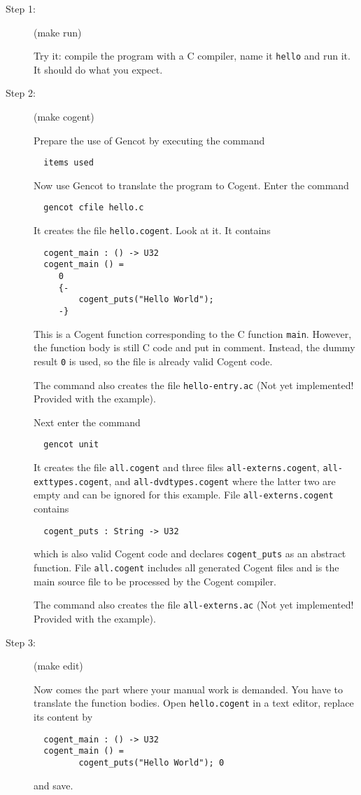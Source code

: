\documentclass[a4paper]{report}
\newcommand{\code}[1]{\textnormal{\texttt{#1}}}
\begin{document}
\begin{description}
\item[Step 1:] (make run)

Try it: compile the program with a C compiler, name it \code{hello} and run it. It should do what you expect.

\item[Step 2:] (make cogent)

Prepare the use of Gencot by executing the command
\begin{verbatim}
  items used
\end{verbatim}

Now use Gencot to translate the program to Cogent. Enter the command
\begin{verbatim}
  gencot cfile hello.c
\end{verbatim}
It creates the file \code{hello.cogent}. Look at it. It contains
\begin{verbatim}
  cogent_main : () -> U32
  cogent_main () =
     0
     {-
         cogent_puts("Hello World");
     -}
\end{verbatim}
This is a Cogent function corresponding to the C function \code{main}. However, the function body is still C code
and put in comment. Instead, the dummy result \code{0} is used, so the file is already valid Cogent code.

The command also creates the file \code{hello-entry.ac} (Not yet implemented! Provided with the example).

Next enter the command
\begin{verbatim}
  gencot unit
\end{verbatim}
It creates the file \code{all.cogent} and three files \code{all-externs.cogent}, \code{all-exttypes.cogent}, 
and \code{all-dvdtypes.cogent} where the latter two are empty and can be ignored for this example. File 
\code{all-externs.cogent} contains
\begin{verbatim}
  cogent_puts : String -> U32
\end{verbatim}
which is also valid Cogent code and declares \code{cogent\_puts} as an abstract function. File \code{all.cogent}
includes all generated Cogent files and is the main source file to be processed by the Cogent compiler.

The command also creates the file \code{all-externs.ac} (Not yet implemented! Provided with the example).

\item[Step 3:] (make edit)

Now comes the part where your manual work is demanded. You have to translate the function bodies.
Open \code{hello.cogent} in a text editor, replace its content by
\begin{verbatim}
  cogent_main : () -> U32
  cogent_main () =
         cogent_puts("Hello World"); 0
\end{verbatim}
and save. 


\end{description}
\end{document}

